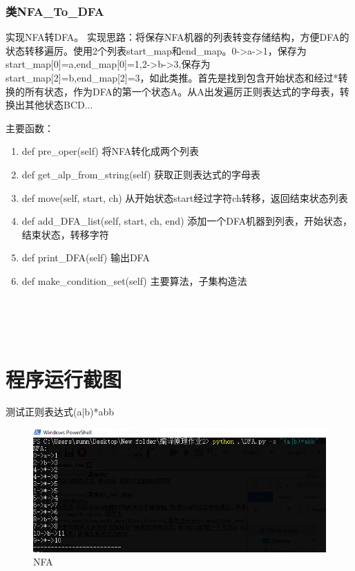 \documentclass[]{article}
\begin{document}
\subsubsection*{类NFA\_To\_DFA}
实现NFA转DFA。
实现思路：将保存NFA机器的列表转变存储结构，方便DFA的状态转移遍厉。使用2个列表start\_map和end\_map。0->a->1，保存为 start\_map[0]=a,end\_map[0]=1,2->b->3,保存为start\_map[2]=b,end\_map[2]=3，如此类推。首先是找到包含开始状态和经过*转换的所有状态，作为DFA的第一个状态A。从A出发遍厉正则表达式的字母表，转换出其他状态BCD...

主要函数：
\begin{enumerate}
	\item  def pre\_oper(self)  将NFA转化成两个列表
	\item  def get\_alp\_from\_string(self)  获取正则表达式的字母表
	\item  def move(self, start, ch)  从开始状态start经过字符ch转移，返回结束状态列表
	\item  def add\_DFA\_list(self, start, ch, end)  添加一个DFA机器到列表，开始状态，结束状态，转移字符
	\item  def print\_DFA(self)  输出DFA
	\item  def make\_condition\_set(self)  主要算法，子集构造法
\end{enumerate}
~\\\
~\\\
\section{程序运行截图}
测试正则表达式(a|b)*abb

\begin{figure}[h]
	\centering
	\includegraphics[width = 1\textwidth]{1.PNG}
	\caption{NFA}
\end{figure}
\end{document}
